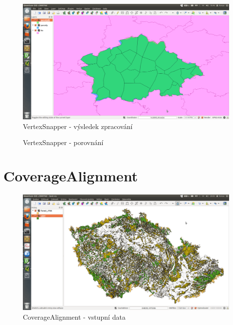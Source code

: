   \begin{figure}[H]
    \centering
      \includegraphics[width=400pt]{./pictures/test-vs2.png}
      \caption{VertexSnapper - výsledek zpracování}
      \label{fig:vs2}
  \end{figure}

  \begin{figure}[H]
    \centering
      \def\svgwidth{420pt}
      
      \caption{VertexSnapper - porovnání}
      \label{fig:vs3}
  \end{figure}

\section{CoverageAlignment}
\label{ukazky-ca}

  \begin{figure}[H]
    \centering
      \includegraphics[width=400pt]{./pictures/test-ca1.png}
      \caption{CoverageAlignment - vstupní data}
      \label{fig:ca1}
  \end{figure}

